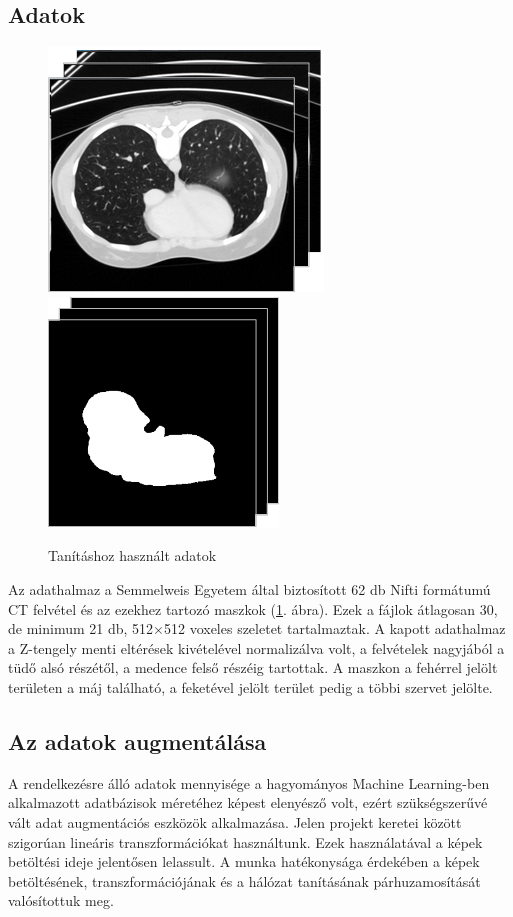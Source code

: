 \documentclass[a4paper]{article}
\begin{document}
	\subsection{Adatok}
	\begin{figure}
		\centering
		\includegraphics[width=0.45\linewidth]{figures/LiverInputSample}
		\includegraphics[width=0.45\linewidth]{figures/MaskInputSample}
		\caption{Tanításhoz használt adatok}
		\label{fig:liverinputsample}
	\end{figure}
	Az adathalmaz a Semmelweis Egyetem által biztosított 62 db Nifti formátumú CT felvétel és az ezekhez tartozó maszkok (\ref{fig:liverinputsample}. ábra). Ezek a fájlok átlagosan 30, de minimum 21 db, 512$\times$512 voxeles szeletet tartalmaztak. A kapott adathalmaz a Z-tengely menti eltérések kivételével normalizálva volt, a felvételek nagyjából a tüdő alsó részétől, a medence felső részéig tartottak. A maszkon a fehérrel jelölt területen a máj található, a feketével jelölt terület pedig a többi szervet jelölte.\\
	\subsection{Az adatok augmentálása}
	A rendelkezésre álló adatok mennyisége a hagyományos Machine Learning-ben alkalmazott adatbázisok méretéhez képest elenyésző volt, ezért szükségszerűvé vált adat augmentációs eszközök alkalmazása. Jelen projekt keretei között szigorúan lineáris transzformációkat használtunk. Ezek használatával a képek betöltési ideje jelentősen lelassult. A munka hatékonysága érdekében a képek betöltésének, transzformációjának és a hálózat tanításának párhuzamosítását valósítottuk meg.
	\pagebreak
\end{document}
